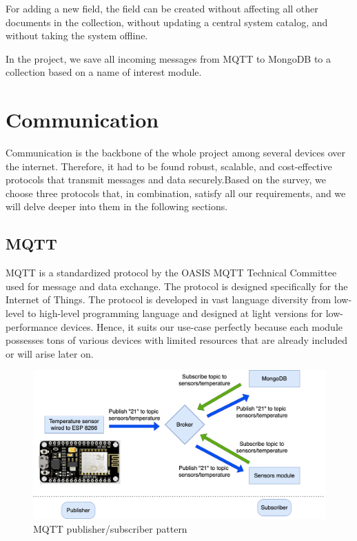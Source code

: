 For adding a new field, the field can be created without affecting all other documents in the collection, without updating a central system catalog, and without taking the system offline. 

In the project, we save all incoming messages from MQTT to MongoDB to a collection based on a name of interest module.

\section{Communication}

Communication is the backbone of the whole project among several devices over the internet. Therefore, it had to be found robust, scalable, and cost-effective protocols that transmit messages and data securely.Based on the survey, we choose three protocols that, in combination, satisfy all our requirements, and we will delve deeper into them in the following sections.

\subsection{MQTT}

MQTT is a standardized protocol by the OASIS MQTT Technical Committee used for message and data exchange. The protocol is designed specifically for the Internet of Things. The protocol is developed in vast language diversity from low-level to high-level programming language and designed at light versions for low-performance devices. Hence, it suits our use-case perfectly because each module possesses tons of various devices with limited resources that are already included or will arise later on. \citep{mqtt_malý_2016}

\begin{figure}[H]
	\centering
	\includegraphics[width=\textwidth]{img/MQTT_pub_sub_pattern.png}
	\caption{MQTT publisher/subscriber pattern}
	\label{fig:MQTT_pub_sub_pattern}
  \end{figure}

